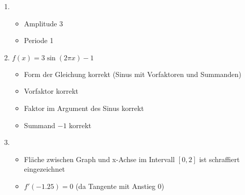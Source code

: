 \item
	\begin{enumerate}
	
		\item
			\begin{itemize}
				\item Amplitude 3
				\item Periode 1
			\end{itemize}
				
		\item $f(x) = 3\sin(2\pi x)-1$
			\begin{itemize}
				\item Form der Gleichung korrekt (Sinus mit Vorfaktoren und Summanden)
				\item Vorfaktor korrekt
				\item Faktor im Argument des Sinus korrekt
				\item Summand $-1$ korrekt
			\end{itemize}

		\item
			\begin{itemize}
				\item Fläche zwischen Graph und x-Achse im Intervall $[0,2]$ ist schraffiert eingezeichnet
				\item $f'(-1.25) = 0$ (da Tangente mit Anstieg $0$)
			\end{itemize}
	
	\end{enumerate}
